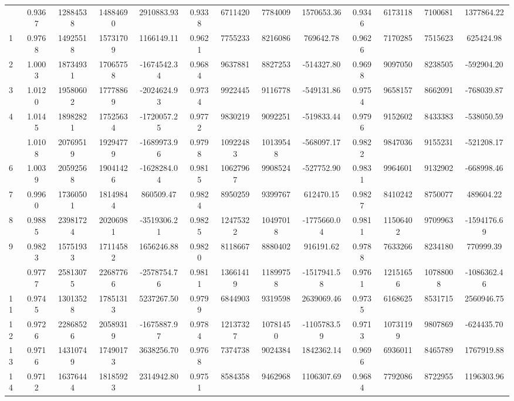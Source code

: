 \documentclass[
  12pt,
]{article}
\begin{document}
\begin{longtable}[t]{lcccccccccccc}
\endfoot
\bottomrule
\endlastfoot
0 & 0.9367 & 12884538 & 14884690 & 2910883.93 & 0.9338 & 6711420 & 7784009 & 1570653.36 & 0.9346 & 6173118 & 7100681 & 1377864.22\\
1 & 0.9768 & 14925518 & 15731709 & 1166149.11 & 0.9621 & 7755233 & 8216086 & 769642.78 & 0.9626 & 7170285 & 7515623 & 625424.98\\
2 & 1.0003 & 18734931 & 17065758 & -1674542.34 & 0.9684 & 9637881 & 8827253 & -514327.80 & 0.9698 & 9097050 & 8238505 & -592904.20\\
3 & 1.0120 & 19580602 & 17778869 & -2024624.93 & 0.9734 & 9922445 & 9116778 & -549131.86 & 0.9754 & 9658157 & 8662091 & -768039.87\\
4 & 1.0145 & 18982821 & 17525634 & -1720057.25 & 0.9772 & 9830219 & 9092251 & -519833.44 & 0.9796 & 9152602 & 8433383 & -538050.59\\
\addlinespace
5 & 1.0108 & 20769519 & 19294779 & -1689973.96 & 0.9798 & 10922483 & 10139548 & -568097.17 & 0.9822 & 9847036 & 9155231 & -521208.17\\
6 & 1.0039 & 20592568 & 19041426 & -1628284.04 & 0.9815 & 10627967 & 9908524 & -527752.90 & 0.9831 & 9964601 & 9132902 & -668998.46\\
7 & 0.9960 & 17360501 & 18149844 & 860509.47 & 0.9824 & 8950259 & 9399767 & 612470.15 & 0.9827 & 8410242 & 8750077 & 489604.22\\
8 & 0.9885 & 23981724 & 20206981 & -3519306.21 & 0.9825 & 12475322 & 10497018 & -1775660.04 & 0.9811 & 11506402 & 9709963 & -1594176.69\\
9 & 0.9823 & 15751933 & 17114582 & 1656246.88 & 0.9820 & 8118667 & 8880402 & 916191.62 & 0.9788 & 7633266 & 8234180 & 770999.39\\
\addlinespace
10 & 0.9777 & 25813075 & 22687766 & -2578754.76 & 0.9811 & 13661419 & 11899758 & -1517941.58 & 0.9761 & 12151656 & 10788008 & -1086362.46\\
11 & 0.9745 & 13013528 & 17851313 & 5237267.50 & 0.9799 & 6844903 & 9319598 & 2639069.46 & 0.9735 & 6168625 & 8531715 & 2560946.75\\
12 & 0.9726 & 22868526 & 20589319 & -1675887.97 & 0.9784 & 12137327 & 10781450 & -1105783.59 & 0.9713 & 10731199 & 9807869 & -624435.70\\
13 & 0.9716 & 14310749 & 17490173 & 3638256.70 & 0.9768 & 7374738 & 9024384 & 1842362.14 & 0.9696 & 6936011 & 8465789 & 1767919.88\\
14 & 0.9712 & 16376444 & 18185923 & 2314942.80 & 0.9751 & 8584358 & 9462968 & 1106307.69 & 0.9684 & 7792086 & 8722955 & 1196303.96\\

\end{longtable}
\end{document}
